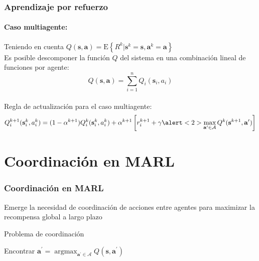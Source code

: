 \documentclass[11pt]{beamer}
\DeclareMathOperator*{\argmax}{argmax}
\begin{document}
\begin{frame}
\frametitle{Aprendizaje por refuerzo}
\framesubtitle{Caso multiagente:}
Teniendo en cuenta $Q(\mathbf{s},\mathbf{a})=\mathrm{E}\left\lbrace R^k | \mathbf{s}^k=\mathbf{s}, \mathbf{a}^k=\mathbf{a} \right\rbrace $\\
\bigskip
Es posible descomponer la función $Q$ del sistema en una combinación lineal de funciones por agente:
$$Q(\mathbf{s},\mathbf{a})=\sum_{i=1}^{n}Q_i(\mathbf{s}_i,a_i)$$\\
Regla de actualización para el caso multiagente:
$$Q_i^{k+1}(\mathbf{s}_i^k,a_i^k)=(1-\alpha^{k+1})Q_i^k(\mathbf{s}_i^k,a_i^k)+\alpha^{k+1} \left[r_i^{k+1} + \gamma \alert<2>{\max_{\mathbf{a}^\prime \in \mathcal{A}}Q^k(\mathbf{s}^{k+1},\mathbf{a}^\prime)} \right]$$
\pause
\end{frame}

\section{Coordinación en MARL}
\begin{frame}
\frametitle{Coordinación en MARL}
Emerge la necesidad de coordinación de acciones entre agentes para maximizar la recompensa global a largo plazo\\
\bigskip
\begin{alertblock}{Problema de coordinación}
\begin{center}
Encontrar $\mathbf{a}^\prime = \argmax_{\mathbf{a}^\prime \in \mathcal{A}}Q(\mathbf{s},\mathbf{a}^\prime)$
\end{center}
\end{alertblock}
\end{frame}

\end{document}
